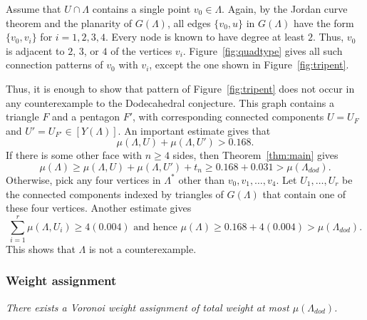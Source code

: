 \documentclass{article} %
\begin{document}
Assume that $U\cap\Lambda$ contains a single point $v_0\in\Lambda$.  Again, by
the Jordan curve theorem and the planarity of $G(\Lambda)$, 
all edges $\{v_0,u\}$ in $G(\Lambda)$ have the form
$\{v_0,v_i\}$ for $i=1,2,3,4$.  Every node is known to have degree
at least $2$.  Thus,  $v_0$ is adjacent to $2$, $3$, or $4$ of the vertices $v_i$.
Figure~\ref{fig:quadtype} gives all such connection patterns of $v_0$ with $v_i$, except
the one shown in Figure~\ref{fig:tripent}.  


\begin{floatingfigure}{25mm}
  \begin{center}
  \end{center}
  \caption{}
\label{fig:tripent}
\end{floatingfigure}

Thus, it is enough to show that pattern of Figure~\ref{fig:tripent} does not occur 
in any counterexample to the Dodecahedral conjecture.  This graph contains a triangle
$F$ and a pentagon $F'$, with corresponding connected components
$U=U_F$ and $U'=U_{F'}\in[Y(\Lambda)]$.
An important estimate \cite[Lemma~10.1]{Hales:2002:Dodec} gives that
$$
\mu(\Lambda,U) + \mu(\Lambda,U') > 0.168.
$$
If there is some other face  with $n\ge 4$ sides, then 
Theorem~\ref{thm:main} gives
$$
\mu(\Lambda) \ge \mu(\Lambda,U)+\mu(\Lambda,U') + t_n \ge 0.168 + 0.031 > \mu(\Lambda_{dod}).
$$
Otherwise, pick any four vertices in $\Lambda^*$ other than $v_0,v_1,\ldots,v_4$.  Let $U_1,\ldots,U_r$ be the connected components
indexed by triangles of $G(\Lambda)$
that contain one of these four vertices.  
Another estimate \cite[Lemma~5.2]{Hales:2002:Dodec} gives
$$
\sum_{i=1}^r \mu(\Lambda,U_i) \ge 4 (0.004) \text{ and hence }
\mu(\Lambda) \ge 0.168 + 4(0.004) > \mu(\Lambda_{dod}).
$$
This shows that $\Lambda$ is not a counterexample.

\subsubsection{Weight assignment}

{\it There exists a Voronoi weight assignment of total weight at most $\mu(\Lambda_{dod})$.}
\end{document}
